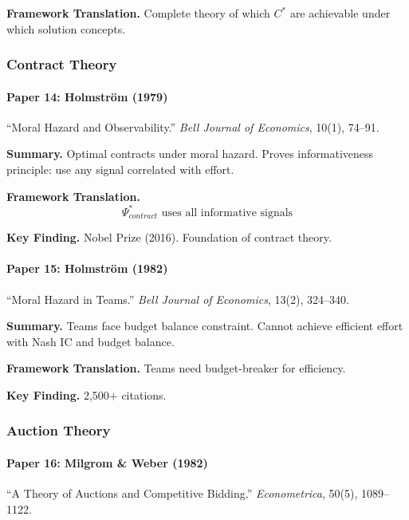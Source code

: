 \textbf{Framework Translation.}
Complete theory of which $C^*$ are achievable under which solution concepts.

\subsubsection{Contract Theory}

\paragraph{Paper 14: Holmström (1979)}

``Moral Hazard and Observability.''
\textit{Bell Journal of Economics}, 10(1), 74--91.

\textbf{Summary.}
Optimal contracts under moral hazard. Proves informativeness principle:
use any signal correlated with effort.

\textbf{Framework Translation.}
\begin{equation}
\Psi^*_{contract} \text{ uses all informative signals}
\end{equation}

\textbf{Key Finding.}
Nobel Prize (2016). Foundation of contract theory.

\paragraph{Paper 15: Holmström (1982)}

``Moral Hazard in Teams.''
\textit{Bell Journal of Economics}, 13(2), 324--340.

\textbf{Summary.}
Teams face budget balance constraint. Cannot achieve efficient effort 
with Nash IC and budget balance.

\textbf{Framework Translation.}
Teams need budget-breaker for efficiency.

\textbf{Key Finding.}
2,500+ citations.

\subsubsection{Auction Theory}

\paragraph{Paper 16: Milgrom \& Weber (1982)}

``A Theory of Auctions and Competitive Bidding.''
\textit{Econometrica}, 50(5), 1089--1122.

